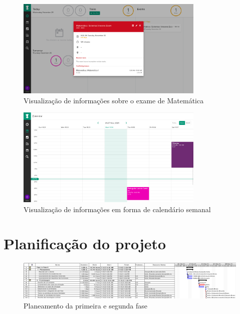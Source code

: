 \documentclass[11pt, twoside]{report}
\begin{document}
\begin{figure}[H] 
	\centering 
	\includegraphics[width=0.8\textwidth,height=0.8\textheight,keepaspectratio]{image/estadodearte/informacoesexame}
	\caption{Visualização de informações sobre o exame de Matemática}
	\label{examematematica}
\end{figure}

\begin{figure}[H] 
	\centering 
	\includegraphics[width=0.8\textwidth,height=0.8\textheight,keepaspectratio]{image/estadodearte/calendariostudy}
	\caption{Visualização de informações em forma de calendário semanal}
	\label{calendariostudylife}
\end{figure}




	 
	
	
	\chapter{Planificação do projeto}

 	
		
	\clearpage
	\begin{landscape}
		\pagestyle{empty}
		
		\begin{figure}[H] 
			\centering 			\includegraphics[width=1.4\textwidth,height=1.4\textheight,keepaspectratio]{image/planeamento_1fase}
			\caption{Planeamento da primeira e segunda fase}
			
		\end{figure}
	\end{landscape}
	
\end{document}
